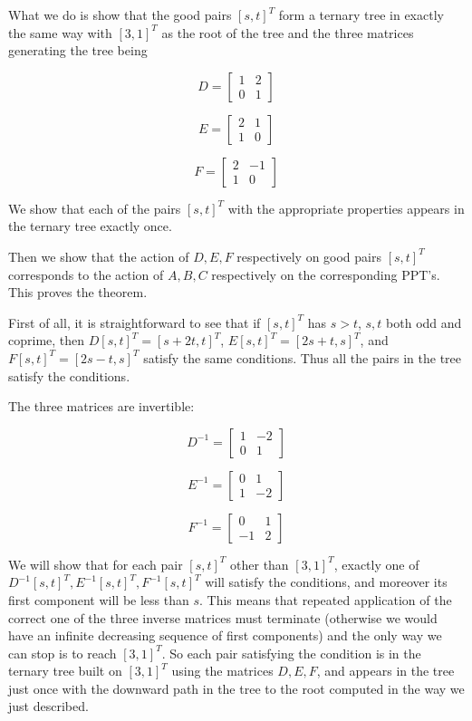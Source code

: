 \documentclass[12pt]{article}
\begin{document}
What we do is show that the good pairs $[s,t]^T$ form a ternary tree in exactly the same way with $[3,1]^T$ as the root of the tree and the three matrices generating the tree
being

$$D=\left[\begin{array}{ccc} 1 & 2  \\ 0 & 1 \end{array}\right]$$

$$E=\left[\begin{array}{ccc} 2 & 1\\ 1 & 0 \end{array}\right]$$

$$F=\left[\begin{array}{ccc} 2 & -1 \\ 1 &  0 \end{array}\right]$$

We show that each of the pairs $[s,t]^T$ with the appropriate properties appears in the ternary tree exactly once.

Then we show that the action of $D,E,F$ respectively on good pairs $[s,t]^T$ corresponds to the action of $A,B,C$ respectively on the corresponding PPT's.   This proves the theorem.

First of all, it is straightforward to see that if $[s,t]^T$ has $s>t$, $s,t$ both odd and coprime, then $D[s,t]^T = [s+2t,t]^T$,   $E[s,t]^T = [2s+t,s]^T$, and $F[s,t]^T = [2s-t,s]^T$
satisfy the same conditions.   Thus all the pairs in the tree satisfy the conditions.



The three matrices are invertible:  

$$D^{-1}=\left[\begin{array}{ccc} 1 & -2  \\ 0 & 1 \end{array}\right]$$

$$E^{-1}=\left[\begin{array}{ccc} 0 & 1\\ 1 & -2 \end{array}\right]$$

$$F^{-1}=\left[\begin{array}{ccc} 0 & 1 \\ -1 &  2 \end{array}\right]$$

We will show that for each pair $[s,t]^T$ other than $[3,1]^T$, exactly one of $D^{-1}[s,t]^T, E^{-1}[s,t]^T,F^{-1}[s,t]^T$  will satisfy the conditions, and moreover its first component will
be less than $s$.   This means that repeated application of the correct one of the three inverse matrices must terminate (otherwise we would have an infinite decreasing sequence of first components) and the only way we can stop is to reach $[3,1]^T$.   So each pair satisfying the condition is in the ternary tree built on $[3,1]^T$ using the matrices $D,E,F$, and appears in the tree just once with the downward path in the tree to the root computed in the way we just described.
\end{document}
